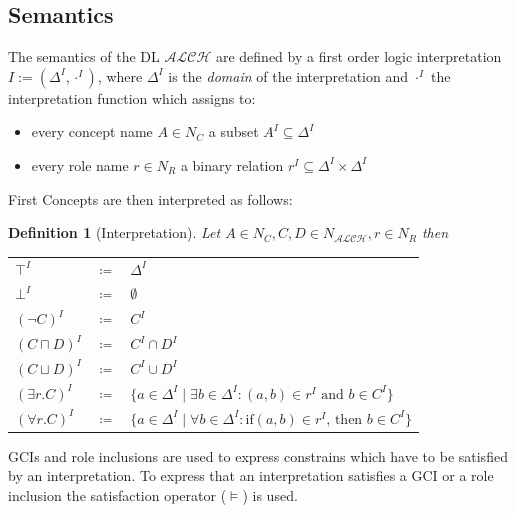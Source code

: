 \documentclass[titlepage]{article}
\newtheorem{definition}{Definition}
\begin{document}
\subsection{Semantics}
The semantics of the DL $\mathcal{ALCH}$ are defined by a first order logic interpretation
$I := (\Delta^I, \cdot^I)$, where $\Delta^I$ is the \emph{domain} of the interpretation
and $\cdot^I$ the interpretation function which assigns to:
\begin{itemize}
  \item every concept name $A \in N_C$ a subset $A^I \subseteq \Delta^I$
  \item every role name $r \in N_R$ a binary relation $r^I \subseteq \Delta^I \times \Delta^I$
\end{itemize}
First 
Concepts are then interpreted as follows:
\begin{definition}[Interpretation]
  Let $A \in N_C, C, D \in N_{\mathcal{ALCH}}, r \in N_R$ then
  \begin{center}
    \begin{tabular}{l c l}
    
      $\top^I$& $\coloneqq$& $\Delta^I$ \\
      $\bot^I$& $\coloneqq$& $\emptyset$\\      
      $(\neg C)^I$ & $\coloneqq$ & $C^I$ \\
      $(C \sqcap D)^I$ & $\coloneqq$ & $C^I \cap D^I$ \\
      $(C \sqcup D)^I$ & $\coloneqq$ & $C^I \cup D^I$ \\
      $(\exists r.C)^I$ & $\coloneqq$ & $ \{a \in \Delta^I \mid \exists b \in \Delta^I : (a,b) \in r^I \text{ and } b \in C^I \}$ \\
      $(\forall r.C)^I$ & $\coloneqq$ & $ \{a \in \Delta^I \mid \forall b \in \Delta^I : \text{if} (a,b) \in r^I \text{, then } b \in C^I \}$ \\
      \end{tabular}        
  \end{center}
\end{definition}

GCIs and role inclusions are used to express constrains which have to
be satisfied by an interpretation. To express that an interpretation satisfies a GCI
or a role inclusion the satisfaction operator ($\models$) is used. 
\end{document}
